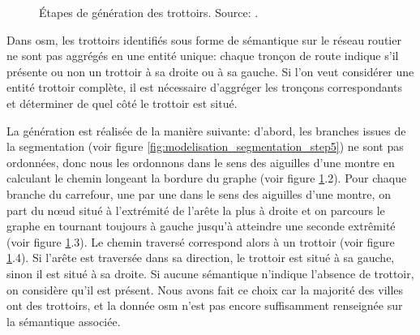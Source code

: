 \begin{figure}
    \centering
    \caption{Étapes de génération des trottoirs. Source: \cite{Kalsron2022}.}
    \label{fig:modelisation_calcul_pieton_trottoirs}
\end{figure}

Dans \gls{osm}, les trottoirs identifiés sous forme de sémantique sur le réseau routier ne sont pas aggrégés en une entité unique: chaque tronçon de route indique s'il présente ou non un trottoir à sa droite ou à sa gauche. Si l'on veut considérer une entité trottoir complète, il est nécessaire d'aggréger les tronçons correspondants et déterminer de quel côté le trottoir est situé.

La génération est réalisée de la manière suivante: d'abord, les branches issues de la segmentation (voir figure \ref{fig:modelisation_segmentation_step5}) ne sont pas ordonnées, donc nous les ordonnons dans le sens des aiguilles d'une montre en calculant le chemin longeant la bordure du graphe (voir figure \ref{fig:modelisation_calcul_pieton_trottoirs}.2). Pour chaque branche du carrefour, une par une dans le sens des aiguilles d'une montre, on part du nœud situé à l'extrémité de l'arête la plus à droite et on parcours le graphe en tournant toujours à gauche jusqu'à atteindre une seconde extrêmité (voir figure \ref{fig:modelisation_calcul_pieton_trottoirs}.3). Le chemin traversé correspond alors à un trottoir (voir figure \ref{fig:modelisation_calcul_pieton_trottoirs}.4). Si l'arête est traversée dans sa direction, le trottoir est situé à sa gauche, sinon il est situé à sa droite. Si aucune sémantique n'indique l'absence de trottoir, on considère qu'il est présent. Nous avons fait ce choix car la majorité des villes ont des trottoirs, et la donnée \gls{osm} n'est pas encore suffisamment renseignée sur la sémantique associée.

